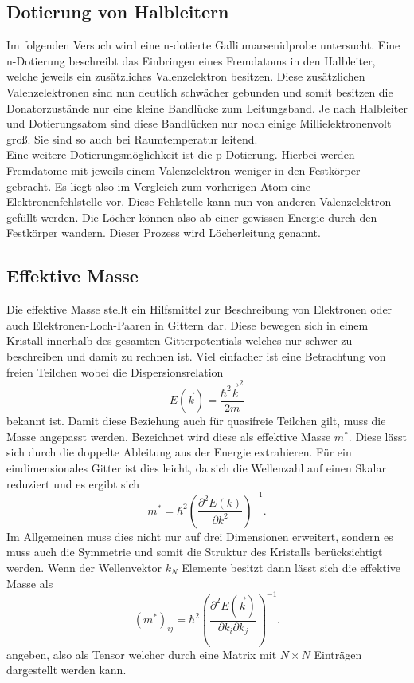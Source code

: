 \subsection{Dotierung von Halbleitern}
Im folgenden Versuch wird eine n-dotierte 
Galliumarsenidprobe untersucht. Eine n-Dotierung beschreibt das Einbringen eines Fremdatoms in den Halbleiter, welche jeweils ein zusätzliches Valenzelektron besitzen. Diese
zusätzlichen Valenzelektronen sind nun deutlich schwächer gebunden und somit besitzen die Donatorzustände nur eine kleine Bandlücke zum Leitungsband. Je nach Halbleiter und Dotierungsatom sind
diese Bandlücken nur noch einige Millielektronenvolt groß. Sie sind so auch bei Raumtemperatur leitend.
\\
Eine weitere Dotierungsmöglichkeit ist die p-Dotierung. Hierbei werden Fremdatome mit jeweils einem Valenzelektron weniger in den Festkörper gebracht. Es liegt also im Vergleich zum vorherigen Atom eine Elektronenfehlstelle vor. 
Diese Fehlstelle kann nun von anderen Valenzelektron gefüllt werden. Die Löcher können also ab einer gewissen Energie durch den Festkörper wandern. Dieser Prozess wird Löcherleitung genannt.

\subsection{Effektive Masse}

Die effektive Masse stellt ein Hilfsmittel zur Beschreibung von Elektronen oder auch Elektronen-Loch-Paaren in Gittern dar. Diese bewegen sich in einem Kristall
innerhalb des gesamten Gitterpotentials welches nur schwer zu beschreiben und damit zu rechnen ist. Viel einfacher ist eine Betrachtung von freien Teilchen wobei
die Dispersionsrelation
\begin{equation*}
E(\vec{k}) = \frac{\hbar^2 \vec{k}^2}{2m}
\end{equation*}
bekannt ist. Damit diese Beziehung auch für quasifreie Teilchen gilt, muss die Masse angepasst werden. Bezeichnet wird diese
als effektive Masse $m^*$. Diese lässt sich durch die doppelte Ableitung aus der Energie extrahieren. Für ein eindimensionales Gitter ist dies leicht, da
sich die Wellenzahl auf einen Skalar reduziert und es ergibt sich
\begin{equation*}
m^* = \hbar^2 \left( \frac{\partial^2 E(k)}{\partial k^2} \right)^{-1}.
\end{equation*}
Im Allgemeinen muss dies nicht nur auf drei Dimensionen erweitert, sondern es muss auch die Symmetrie und somit die Struktur des Kristalls berücksichtigt werden.
Wenn der Wellenvektor $k_N$ Elemente besitzt dann lässt sich die effektive Masse als 
\begin{equation*}
    (m^*)_{ij} = \hbar^2 \left( \frac{\partial^2 E(\vec{k})}{\partial k_i \partial k_j} \right)^{-1}. 
\end{equation*}
angeben, also als Tensor welcher durch eine Matrix mit $N \times N$ Einträgen dargestellt werden kann.

